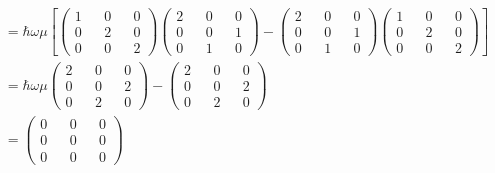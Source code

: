 \documentclass[a4paper, 12pt, notitlepage]{article}
\begin{document}
\begin{enumerate}
\begin{enumerate}[(A)]
  \begin{align*}
  [H, B] &= \hbar \omega \mu \left[ 
  \begin{pmatrix} 
  1 && 0 && 0 \\
  0 && 2 && 0 \\
  0 && 0 && 2
  \end{pmatrix}\begin{pmatrix}
  2 && 0 && 0 \\
  0 && 0 && 1 \\
  0 && 1 && 0  
  \end{pmatrix} - \begin{pmatrix}
  2 && 0 && 0 \\
  0 && 0 && 1 \\
  0 && 1 && 0
  \end{pmatrix} \begin{pmatrix} 
  1 && 0 && 0 \\
  0 && 2 && 0 \\
  0 && 0 && 2
  \end{pmatrix}\right] \\
  &= \hbar \omega \mu \begin{pmatrix}
  2 && 0 && 0 \\
  0 && 0 && 2 \\
  0 && 2 && 0
  \end{pmatrix} - \begin{pmatrix}
  2 && 0 && 0 \\
  0 && 0 && 2 \\
  0 && 2 && 0
  \end{pmatrix} \\
  &= \begin{pmatrix}
  0 && 0 && 0 \\
  0 && 0 && 0 \\
  0 && 0 && 0
  \end{pmatrix}
  \end{align*}
  

\end{enumerate}
\end{enumerate}
\end{document}
